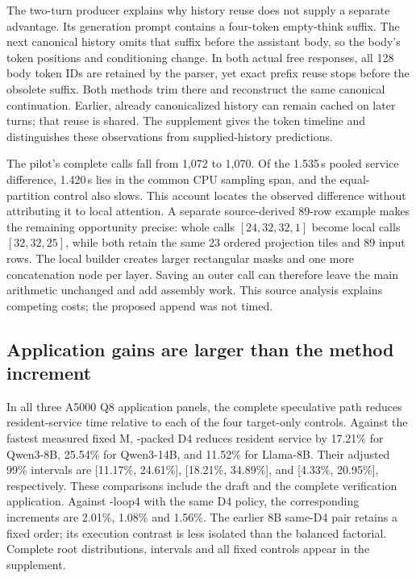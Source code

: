 The two-turn producer explains why history reuse does not supply a separate \Local{} advantage. Its generation prompt contains a four-token empty-think suffix. The next canonical history omits that suffix before the assistant body, so the body's token positions and conditioning change. In both actual free responses, all 128 body token IDs are retained by the parser, yet exact prefix reuse stops before the obsolete suffix. Both methods trim there and reconstruct the same canonical continuation. Earlier, already canonicalized history can remain cached on later turns; that reuse is shared. The supplement gives the token timeline and distinguishes these observations from supplied-history predictions.

The pilot's complete calls fall from 1,072 to 1,070. Of the 1.535\,s pooled service difference, 1.420\,s lies in the common CPU sampling span, and the equal-partition control also slows. This account locates the observed difference without attributing it to local attention. A separate source-derived 89-row example makes the remaining opportunity precise: whole calls $[24,32,32,1]$ become local calls $[32,32,25]$, while both retain the same 23 ordered projection tiles and 89 input rows. The local builder creates larger rectangular masks and one more concatenation node per layer. Saving an outer call can therefore leave the main arithmetic unchanged and add assembly work. This source analysis explains competing costs; the proposed append was not timed.

\subsection{Application gains are larger than the method increment}
\label{sec:application-result}
In all three A5000 Q8 application panels, the complete speculative path reduces resident-service time relative to each of the four target-only controls. Against the fastest measured fixed M, \Local-packed D4 reduces resident service by 17.21\% for Qwen3-8B, 25.54\% for Qwen3-14B, and 11.52\% for Llama-8B. Their adjusted 99\% intervals are [11.17\%, 24.61\%], [18.21\%, 34.89\%], and [4.33\%, 20.95\%], respectively. These comparisons include the draft and the complete verification application. Against \Simple-loop4 with the same D4 policy, the corresponding increments are 2.01\%, 1.08\% and 1.56\%. The earlier 8B same-D4 pair retains a fixed order; its execution contrast is less isolated than the balanced factorial. Complete root distributions, intervals and all fixed controls appear in the supplement.

